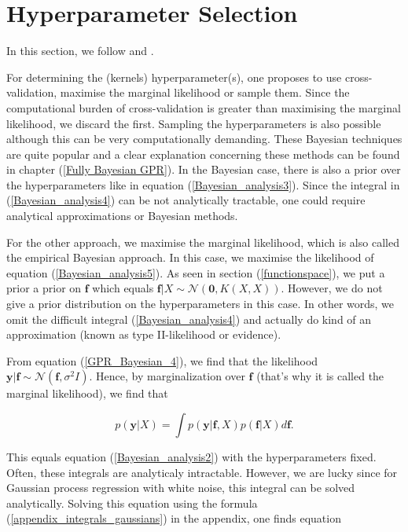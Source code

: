 \documentclass[12pt,a4paper,oneside]{book}
\begin{document}
\section{Hyperparameter Selection}\label{section_hyperparameter_selection}

In this section, we follow \cite{GPRbook} and \cite{camillagpr}. 

For determining the (kernels) hyperparameter(s), one proposes to use cross-validation, maximise the marginal likelihood or sample them. Since the computational burden of cross-validation is greater than maximising the marginal likelihood, we discard the first. Sampling the hyperparameters is also possible although this can be very computationally demanding. These Bayesian techniques are quite popular and a clear explanation concerning these methods can be found in chapter (\ref{Fully Bayesian GPR}). In the Bayesian case, there is also a prior over the hyperparameters like in equation (\ref{Bayesian_analysis3}). Since the integral in (\ref{Bayesian_analysis4}) can be not analytically tractable, one could require analytical approximations or Bayesian methods.  

For the other approach, we maximise the marginal likelihood, which is also called the empirical Bayesian approach. In this case, we maximise  the likelihood of equation (\ref{Bayesian_analysis5}). As seen in section (\ref{functionspace}), we put a prior a prior on $\bm{f}$ which equals $\bm{f}|X \sim \mathcal{N}(\bm{0},K(X,X))$. However, we do not give a prior distribution on the hyperparameters in this case. In other words, we omit the difficult integral (\ref{Bayesian_analysis4}) and actually do kind of an approximation (known as type II-likelihood or evidence). 

From equation (\ref{GPR_Bayesian_4}), we find that the likelihood $\bm{y} | \bm{f} \sim \mathcal{N}(\bm{f},\sigma^2 I)$. Hence, by marginalization over $\bm{f}$ (that's why it is called the marginal likelihood), we find that 

\begin{equation}
p(\bm{y}|X) = \int p(\bm{y}|\bm{f},X)p(\bm{f}|X) d\bm{f}.
\end{equation}

This equals equation (\ref{Bayesian_analysis2}) with the hyperparameters fixed. Often, these integrals are analyticaly intractable. However, we are lucky since for Gaussian process regression with white noise, this integral can be solved analytically. Solving this equation using the formula (\ref{appendix_integrals_gaussians}) in the appendix, one finds equation
\end{document}
